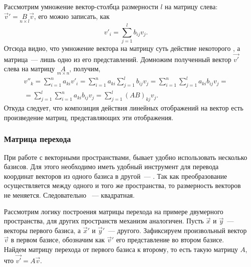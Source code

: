     Рассмотрим умножение вектор-столбца размерности $l$ на матрицу слева: $\vec{v}' = \underset{n \times l}{B}\vec{v}$, его можно записать, как
    \begin{equation*}
        v'_i = \sum\limits_{j=1}^{l} b_{ij} v_j.
    \end{equation*}
    Отсюда видно, что умножение вектора на матрицу суть действие некоторого , а матрица~--- лишь одно из его представлений.
    Домножим полученный вектор $\vec{v'}$ слева на матрицу $\underset{m \times n}{A}$, получим,
    \begin{multline*}
        v''_k 
            = \sum\limits_{i=1}^{n} a_{ki} v'_i 
            = \sum\limits_{i=1}^{n} a_{ki} \sum\limits_{j=1}^{l} b_{ij} v_j
            = \sum\limits_{i=1}^{n} \sum\limits_{j=1}^{l} a_{ki} b_{ij} v_j = \\
            = \sum\limits_{j=1}^{l} \sum\limits_{i=1}^{n} a_{ki} b_{ij} v_j
            = \sum\limits_{j=1}^{l} (AB)_{kj} v_j.
    \end{multline*}
    Откуда следует, что композиция действия линейных отображений на вектор есть произведение матриц, представляющих эти отображения.

    \subsubsection{Матрица перехода}
    При работе с векторными пространствами, бывает удобно использовать несколько базисов. Для этого необходимо иметь удобный инструмент для перевода координат векторов из одного базиса в другой~--- . Так как преобразование осуществляется между  одного и того же пространства, то размерность векторов не меняется. Следовательно ~--- квадратная. 
    
    Рассмотрим логику построения матрицы перехода на примере двумерного пространства, для других пространств механизм аналогичен. Пусть $\vec{x}$ и $\vec{y}$~--- векторы первого базиса, а $\vec{x}'$ и $\vec{y}'$~--- другого. Зафиксируем произвольный вектор $\vec{v}$ в первом базисе, обозначим как $\vec{v}'$ его представление во втором базисе. Найдем матрицу перехода от первого базиса к второму, то есть такую матрицу $A$, что $\vec{v'} = A \vec{v}$.
    
